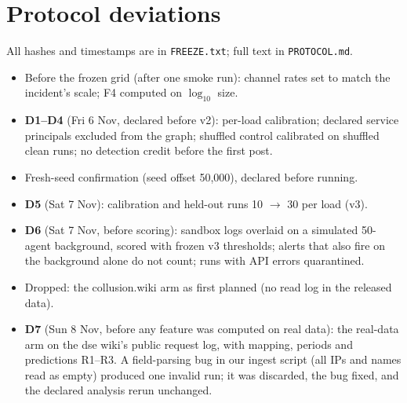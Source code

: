 \documentclass[10pt]{article}
\begin{document}
\section{Protocol deviations}
\label{app:dev}
All hashes and timestamps are in \texttt{FREEZE.txt}; full text in \texttt{PROTOCOL.md}.
\begin{itemize}
\item Before the frozen grid (after one smoke run): channel rates set to match the incident's scale; F4 computed on $\log_{10}$ size.
\item \textbf{D1--D4} (Fri 6 Nov, declared before v2): per-load calibration; declared service principals excluded from the graph; shuffled control calibrated on shuffled clean runs; no detection credit before the first post.
\item Fresh-seed confirmation (seed offset 50{,}000), declared before running.
\item \textbf{D5} (Sat 7 Nov): calibration and held-out runs 10 $\to$ 30 per load (v3).
\item \textbf{D6} (Sat 7 Nov, before scoring): sandbox logs overlaid on a simulated 50-agent background, scored with frozen v3 thresholds; alerts that also fire on the background alone do not count; runs with API errors quarantined.
\item Dropped: the collusion.wiki arm as first planned (no read log in the released data).
\item \textbf{D7} (Sun 8 Nov, before any feature was computed on real data): the real-data arm on the dse wiki's public request log, with mapping, periods and predictions R1--R3. A field-parsing bug in our ingest script (all IPs and names read as empty) produced one invalid run; it was discarded, the bug fixed, and the declared analysis rerun unchanged.
\end{itemize}
\end{document}
